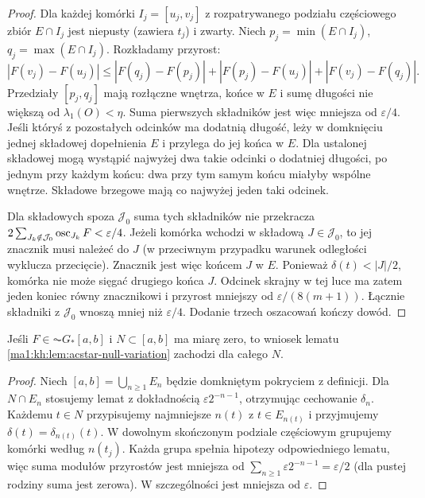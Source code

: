 \begin{proof}
Dla każdej komórki $I_j=[u_j,v_j]$ z rozpatrywanego podziału częściowego zbiór $E\cap I_j$ jest niepusty (zawiera $t_j$) i zwarty. Niech $p_j=\min(E\cap I_j)$, $q_j=\max(E\cap I_j)$. Rozkładamy przyrost:
\[
 |F(v_j)-F(u_j)|
 \le |F(q_j)-F(p_j)|+|F(p_j)-F(u_j)|+|F(v_j)-F(q_j)|.
\]
Przedziały $[p_j,q_j]$ mają rozłączne wnętrza, końce w $E$ i sumę długości nie większą od $\lambda_1(O)<\eta$. Suma pierwszych składników jest więc mniejsza od $\varepsilon/4$. Jeśli któryś z pozostałych odcinków ma dodatnią długość, leży w domknięciu jednej składowej dopełnienia $E$ i przylega do jej końca w $E$. Dla ustalonej składowej mogą wystąpić najwyżej dwa takie odcinki o dodatniej długości, po jednym przy każdym końcu: dwa przy tym samym końcu miałyby wspólne wnętrze. Składowe brzegowe mają co najwyżej jeden taki odcinek.

Dla składowych spoza $\mathcal J_0$ suma tych składników nie przekracza $2\sum_{J_k\notin\mathcal J_0}\operatorname{osc}_{J_k}F<\varepsilon/4$. Jeżeli komórka wchodzi w składową $J\in\mathcal J_0$, to jej znacznik musi należeć do $J$ (w przeciwnym przypadku warunek odległości wyklucza przecięcie). Znacznik jest więc końcem $J$ w $E$. Ponieważ $\delta(t)<|J|/2$, komórka nie może sięgać drugiego końca $J$. Odcinek skrajny w tej luce ma zatem jeden koniec równy znacznikowi i przyrost mniejszy od $\varepsilon/(8(m+1))$. Łącznie składniki z $\mathcal J_0$ wnoszą mniej niż $\varepsilon/4$. Dodanie trzech oszacowań kończy dowód.
\end{proof}

\begin{wniosek}
\label{ma1:kh:cor:acgstar-null-variation}\label{it:cor:acgstar-null-variation}
Jeśli $F\in\AC G_*[a,b]$ i $N\subset[a,b]$ ma miarę zero, to wniosek lematu \ref{ma1:kh:lem:acstar-null-variation} zachodzi dla całego $N$.
\end{wniosek}
\begin{proof}
Niech $[a,b]=\bigcup_{n\ge1}E_n$ będzie domkniętym pokryciem z definicji. Dla $N\cap E_n$ stosujemy lemat z dokładnością $\varepsilon2^{-n-1}$, otrzymując cechowanie $\delta_n$. Każdemu $t\in N$ przypisujemy najmniejsze $n(t)$ z $t\in E_{n(t)}$ i przyjmujemy $\delta(t)=\delta_{n(t)}(t)$. W dowolnym skończonym podziale częściowym grupujemy komórki według $n(t_j)$. Każda grupa spełnia hipotezy odpowiedniego lematu, więc suma modułów przyrostów jest mniejsza od $\sum_{n\ge1}\varepsilon2^{-n-1}=\varepsilon/2$ (dla pustej rodziny suma jest zerowa). W szczególności jest mniejsza od $\varepsilon$.
\end{proof}

